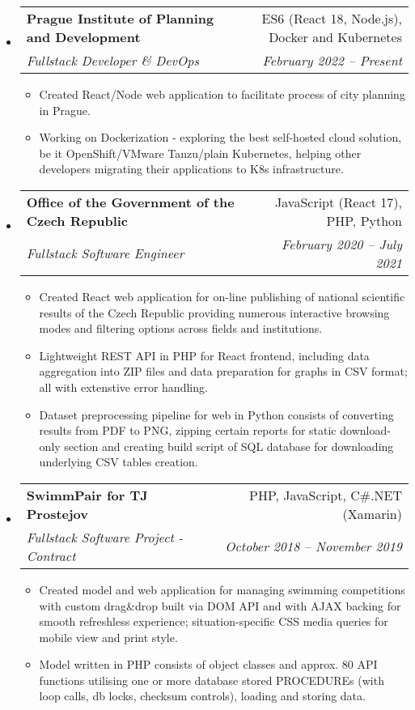\documentclass[letterpaper,11pt]{article}
\makeatletter
\newcommand{\sitem}[1]{\item #1 \vspace{-2pt}}
\newcommand{\resumeSubheading}[4]{
  \vspace{-1pt}\item
    \begin{tabular*}{0.97\textwidth}[t]{l@{\extracolsep{\fill}}r}
      \textbf{#1} & #2 \\
      \textit{\small#3} & \textit{\small #4} \\
    \end{tabular*}\vspace{-5pt}
}
\newenvironment{subheadingListing}{\begin{itemize}[leftmargin=*]}{\end{itemize}}
\newenvironment{resumeList}{\begin{itemize}}{\end{itemize}\vspace{-5pt}}
\makeatother
\begin{document}
\begin{subheadingListing}

  \resumeSubheading
  {Prague Institute of Planning and Development}{ES6 (React 18, Node.js), Docker and Kubernetes}
  {Fullstack Developer \& DevOps}{February 2022 – Present}
  \begin{resumeList}
    \sitem{Created React/Node web application to facilitate process of city planning in Prague.}
    \sitem{Working on Dockerization - exploring the best self-hosted cloud solution, be it OpenShift/VMware Tanzu/plain Kubernetes, helping other developers migrating their applications to K8s infrastructure.}
  \end{resumeList}

  \resumeSubheading
  {Office of the Government of the Czech Republic}{JavaScript (React 17), PHP, Python}
  {Fullstack Software Engineer}{February 2020 – July 2021}
  \begin{resumeList}
    \sitem{Created React web application for on-line publishing of national scientific results of the Czech Republic providing numerous interactive browsing modes and filtering options across fields and institutions.}
    \sitem{Lightweight REST API in PHP for React frontend, including data aggregation into ZIP files and data preparation for graphs in CSV format; all with extenstive error handling.}
    \sitem{Dataset preprocessing pipeline for web in Python consists of converting results from PDF to PNG, zipping certain reports for static download-only section and creating build script of SQL database for downloading underlying CSV tables creation.}
  \end{resumeList}

  \resumeSubheading
  {SwimmPair for TJ Prostejov}{PHP, JavaScript, C\#.NET (Xamarin)}
  {Fullstack Software Project - Contract}{October 2018 – November 2019}
  \begin{resumeList}
    \sitem{Created model and web application for managing swimming competitions with custom drag\&drop built via DOM API and with AJAX backing for smooth refreshless experience; situation-specific CSS media queries for mobile view and print style.}
    \sitem{Model written in PHP consists of object classes and approx. 80 API functions utilising one or more database stored PROCEDUREs (with loop calls, db locks, checksum controls), loading and storing data.}
  \end{resumeList}


\end{subheadingListing}
\end{document}
